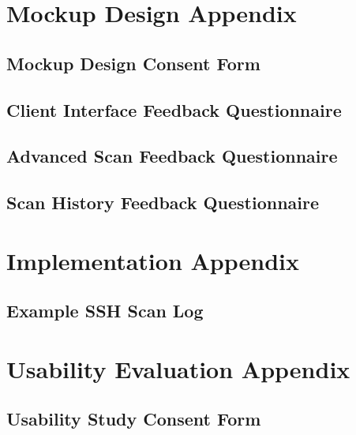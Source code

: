 \chapter{Mockup Design Appendix}

\section{Mockup Design Consent Form}

 \clearpage

\section{Client Interface Feedback Questionnaire}

 \clearpage

\section{Advanced Scan Feedback Questionnaire}

 \clearpage

\section{Scan History Feedback Questionnaire}

 \clearpage

\chapter{Implementation Appendix}

\section{Example SSH Scan Log}

\begin{figure}[h]
	
\end{figure}
\clearpage

\chapter{Usability Evaluation Appendix}

\section{Usability Study Consent Form}

